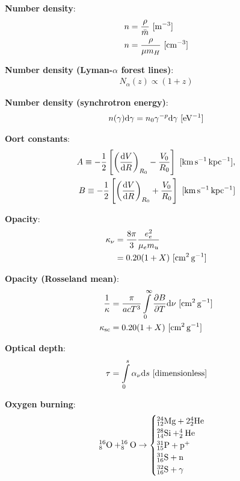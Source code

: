 \documentclass[a4paper,10pt]{article}
\begin{document}
{\noindent}\textbf{Number density}:
\begin{align*}
    n &= \frac{\rho}{\bar{m}} ~ [{\rm m^{-3}}] \\
    n &= \frac{\rho}{\mu m_H} ~ [{\rm cm^{-3}}]
\end{align*}

{\noindent}\textbf{Number density (Lyman-$\alpha$ forest lines)}:
\begin{align*}
    N_\alpha(z) \propto (1+z)
\end{align*}

{\noindent}\textbf{Number density (synchrotron energy)}:
\begin{align*}
    n(\gamma){\rm d}\gamma = n_0\gamma^{-p}{\rm d}\gamma ~ [{\rm eV^{-1}}]
\end{align*}

{\noindent}\textbf{Oort constants}:
\begin{align*}
    A \equiv -\frac{1}{2} \left[\left(\frac{{\rm d}V}{{\rm d}R}\right)_{R_0} -\frac{V_0}{R_0}\right] ~ [{\rm km\,s^{-1}\,kpc^{-1}}],\\
    B \equiv -\frac{1}{2} \left[\left(\frac{{\rm d}V}{{\rm d}R}\right)_{R_0} +\frac{V_0}{R_0}\right] ~ [{\rm km\,s^{-1}\,kpc^{-1}}]
\end{align*}

{\noindent}\textbf{Opacity}:
\begin{align*}
    \kappa_\nu &= \frac{8\pi}{3} \frac{e_e^2}{\mu_em_u} \\
    &= 0.20(1+X) ~ [{\rm cm^2\,g^{-1}}]
\end{align*}

{\noindent}\textbf{Opacity (Rosseland mean)}:
\begin{align*} 
    \frac{1}{\kappa} &= \frac{\pi}{acT^3} \int\limits_0^\infty \frac{\partial B}{\partial T} {\rm d}\nu  ~ [{\rm cm^2\,g^{-1}}] \\
    \kappa_{\rm sc} &= 0.20(1+X) ~ [{\rm cm^2\,g^{-1}}]
\end{align*}

{\noindent}\textbf{Optical depth}:
\begin{align*}
    \tau = \int\limits_0^s \alpha_\nu\mathrm{d}s ~ [{\rm dimensionless}]
\end{align*}

{\noindent}\textbf{Oxygen burning}:
\begin{equation*}
^{16}_8{\rm O} + ^{16}_8{\rm O} \rightarrow 
\begin{cases}
    {\rm ^{24}_{12}Mg + 2^4_2He} \\
    {\rm ^{28}_{14}Si + ^4_2He} \\
    {\rm ^{31}_{15}P + p^+} \\
    {\rm ^{31}_{16}S + n} \\
    {\rm ^{32}_{16}S + \gamma}
\end{cases}
\end{equation*}
\end{document}
